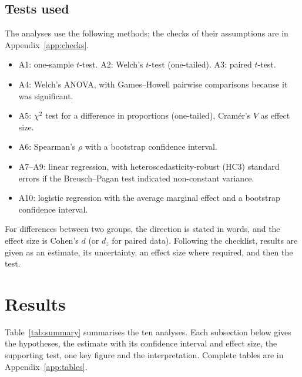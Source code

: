\documentclass[11pt,a4paper]{article}
\newcommand{\intable}[3]{%
  \begingroup
  \def\tabcap{#2}\def\tablab{#3}%
  \renewenvironment{table}[1][]{\par\medskip\begin{lrbox}{\tabbox}}%
    {\end{lrbox}\par\centering
     \ifdim\wd\tabbox>\linewidth
       \resizebox{\linewidth}{!}{\usebox{\tabbox}}%
     \else
       \usebox{\tabbox}%
     \fi
     \par\captionof{table}{\tabcap}\label{\tablab}\medskip}%
  \endgroup}
\begin{document}
\subsection{Tests used}
The analyses use the following methods; the checks of their assumptions are in Appendix~\ref{app:checks}.
\begin{itemize}
  \item A1: one-sample $t$-test. A2: Welch's $t$-test (one-tailed). A3: paired $t$-test.
  \item A4: Welch's ANOVA, with Games--Howell pairwise comparisons because it was significant.
  \item A5: $\chi^2$ test for a difference in proportions (one-tailed), Cram\'er's $V$ as effect size.
  \item A6: Spearman's $\rho$ with a bootstrap confidence interval.
  \item A7--A9: linear regression, with heteroscedasticity-robust (HC3) standard errors if the Breusch--Pagan test indicated non-constant variance.
  \item A10: logistic regression with the average marginal effect and a bootstrap confidence interval.
\end{itemize}
For differences between two groups, the direction is stated in words, and the effect size is Cohen's $d$ (or $d_z$ for paired data). Following the checklist, results are given as an estimate, its uncertainty, an effect size where required, and then the test.

\section{Results}\label{sec:results}
Table~\ref{tab:summary} summarises the ten analyses. Each subsection below gives the hypotheses, the estimate with its confidence interval and effect size, the supporting test, one key figure and the interpretation. Complete tables are in Appendix~\ref{app:tables}.

\begin{landscape}
\intable{A_summary_table.tex}{Main results of the ten analyses. Estimates are followed by their 95\% confidence interval in brackets. $p$-values for A2 and A5 are one-tailed (fixed in advance), all others two-tailed.}{tab:summary}
\end{landscape}

\end{document}
